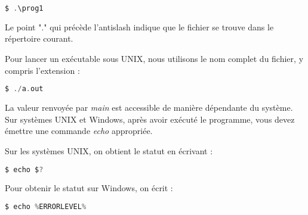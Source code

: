 \medbreak
\begin{lstlisting}[language=C]
	$ .\prog1
\end{lstlisting}
\medbreak

Le point "." qui précède l'antislash indique que le fichier se trouve dans le répertoire courant.

Pour lancer un exécutable sous UNIX, nous utilisons le nom complet du fichier, y compris l'extension :

\medbreak
\begin{lstlisting}[language=C]
	$ ./a.out
\end{lstlisting}
\medbreak

La valeur renvoyée par \textit{main} est accessible de manière dépendante du système. Sur systèmes UNIX et Windows, après avoir exécuté le programme, vous devez émettre une commande \textit{echo} appropriée.

Sur les systèmes UNIX, on obtient le statut en écrivant :

\medbreak
\begin{lstlisting}[language=C]
	$ echo $?
\end{lstlisting}
\medbreak

Pour obtenir le statut sur Windows, on écrit :

\medbreak
\begin{lstlisting}[language=C]
	$ echo %ERRORLEVEL%
\end{lstlisting}
\medbreak

